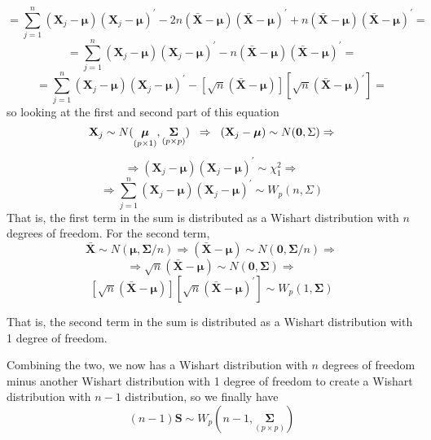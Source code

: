 \documentclass{article}
\begin{document}
    \[
        =
        \scriptstyle{
        \sum_{j=1}^{n}{
            (\textbf{X}_{j} - \bm{\mu}){(\textbf{X}_{j} - \bm{\mu})}^{\prime}
        }
        -
        2n
        (\bar{\textbf{X}} - \bm{\mu})
        {(\bar{\textbf{X}} - \bm{\mu})}^{\prime}
        +
        n
        (\bar{\textbf{X}} - \bm{\mu}){(\bar{\textbf{X}} - \bm{\mu})}^{\prime}
        }
        =
    \]
    \[
        =
        \sum_{j=1}^{n}{
            (\textbf{X}_{j} - \bm{\mu}){(\textbf{X}_{j} - \bm{\mu})}^{\prime}
        }
        -
        n
        (\bar{\textbf{X}} - \bm{\mu})
        {(\bar{\textbf{X}} - \bm{\mu})}^{\prime}
        =
    \]
    \[
        =
        \sum_{j=1}^{n}{
            (\textbf{X}_{j} - \bm{\mu}){(\textbf{X}_{j} - \bm{\mu})}^{\prime}
        }
        -
        \left[
            \sqrt{n}
            (\bar{\textbf{X}} - \bm{\mu})
        \right]
        \left[
            \sqrt{n}
            {(\bar{\textbf{X}} - \bm{\mu})}^{\prime}
        \right]
        =
    \]
    so looking at the first and second part of this equation
    \[
        \textbf{X}_{j}
        \sim
        N(\underset{(p \times 1)}{\bm{\mu}}, \underset{(p \times p)}{\bm{\Sigma}})
        \hspace{0.2cm}
        \Rightarrow
        \hspace{0.2cm}
        (\textbf{X}_{j} - \bm{\mu})
        \sim
        N(\textbf{0}, \Sigma)
        \Rightarrow
    \]
    \[
        \Rightarrow
        (\textbf{X}_{j} - \bm{\mu}){(\textbf{X}_{j} - \bm{\mu})}^{\prime}
        \sim
        \chi_{1}^{2}
        \Rightarrow
    \]
    \[
        \Rightarrow
        \sum_{j=1}^{n}{
            (\textbf{X}_{j} - \bm{\mu}){(\textbf{X}_{j} - \bm{\mu})}^{\prime}
        }
        \sim
        W_{p}(n, \Sigma)
    \]
    That is, the first term in the sum is distributed as a Wishart distribution with $n$ degrees of freedom. For the second term,
    \[
        \bar{\textbf{X}}
        \sim
        N(\bm{\mu}, \bm{\Sigma}/n)
        \Rightarrow
        (\bar{\textbf{X}} - \bm{\mu})
        \sim
        N(\textbf{0}, \bm{\Sigma}/n)
        \Rightarrow
    \]
    \[
        \Rightarrow
        \sqrt{n}
        (\bar{\textbf{X}} - \bm{\mu})
        \sim
        N(\textbf{0}, \bm{\Sigma})
        \Rightarrow
    \]
    \[
        \left[
            \sqrt{n}
            (\bar{\textbf{X}} - \bm{\mu})
        \right]
        \left[
            \sqrt{n}
            {(\bar{\textbf{X}} - \bm{\mu})}^{\prime}
        \right]
        \sim
        W_{p}(1, \bm{\Sigma})
    \]

    That is, the second term in the sum is distributed as a Wishart distribution with 1 degree of freedom.

    Combining the two, we now has a Wishart distribution with $n$ degrees of freedom minus another Wishart distribution with 1 degree of freedom to create a Wishart distribution with $n - 1$ distribution, so we finally have
    \[
        (n-1)\textbf{S}
        \sim
        W_{p}\left(n-1, \underset{(p \times p)}{\bm{\Sigma}}\right)
    \]
\end{document}
